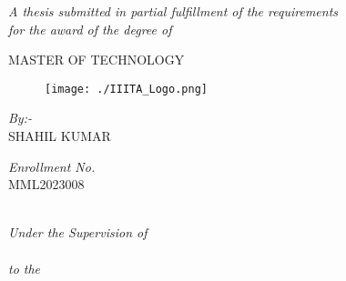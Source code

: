 \frontmatter%

\pagestyle{plain} %

\begin{titlepage}
\begin{center}
\begin{spacing}{1.2}

{\huge \bfseries\ttitle\par}  %

\vspace {5mm}
\textit{A thesis submitted in partial fulfillment of the requirements\\for the award of the degree of} 

\vspace{7mm}
\textsc{\huge MASTER OF TECHNOLOGY}

\vspace {3mm}
\begin{figure}[htp]
    \centering
    \texttt{[image: ./IIITA\_Logo.png]}
\end{figure}
\begin{minipage}[t]{0.5\textwidth}
    \begin{flushleft} \large
        \textit{By:-} \\%
            \textsc{SHAHIL KUMAR} %
    \end{flushleft}
\end{minipage}
\begin{minipage}[t]{0.45\textwidth}
    \begin{flushright} \large
        \textit{Enrollment No.} \\
            \textsc{MML2023008} %
    \end{flushright}
\end{minipage}\\[1cm]

\textit{Under the Supervision of}\\[2mm]
\textsc{\Large \supname}\\%

\vspace{7mm}
\textit{to the}\\[2mm]
\textsc{\Large \deptname}\\ %


\end{spacing}
\end{center}
\end{titlepage}
